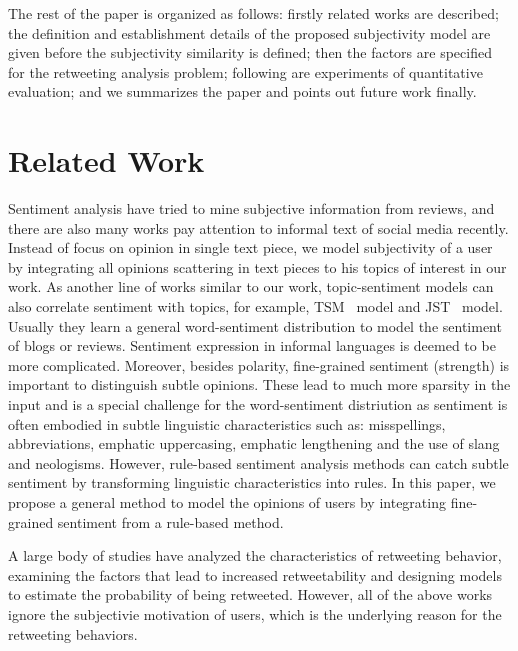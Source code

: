 \documentclass[letterpaper]{article}
\begin{document}
The rest of the paper is organized as follows: firstly related works are described; the definition and establishment details of the proposed subjectivity model are given before the subjectivity similarity is defined; then the factors are specified for the retweeting analysis problem; following are experiments of quantitative evaluation; and we summarizes the paper and points out future work finally.

\section{Related Work}
\label{relatedwork}

Sentiment analysis have tried to mine subjective information from reviews\cite{liu2012sentiment}, and there are also many works pay attention to informal text of social media recently\cite{jiang2011target,tan2011user,Guerra2014}. Instead of focus on opinion in single text piece, we model subjectivity of a user by integrating all opinions scattering in text pieces to his topics of interest in our work. As another line of works similar to our work, topic-sentiment models can also correlate sentiment with topics, for example, TSM~\cite{mei2007topic} model and JST~\cite{lin2009joint} model. Usually they learn a general word-sentiment distribution to model the sentiment of blogs or reviews. Sentiment expression in informal languages is deemed to be more complicated. Moreover, besides polarity, fine-grained sentiment (strength) is important to distinguish subtle opinions. These lead to much more sparsity in the input and is a special challenge for the word-sentiment distriution as sentiment is often embodied in subtle linguistic characteristics such as: misspellings, abbreviations, emphatic uppercasing, emphatic lengthening and the use of slang and neologisms.  However, rule-based sentiment analysis methods can catch subtle sentiment by transforming linguistic characteristics into rules\cite{thelwall2010sentiment}. In this paper, we propose a general method to model the opinions of users by integrating fine-grained sentiment from a rule-based method.
   
A large body of studies have analyzed the characteristics of retweeting behavior\cite{Bian2014,Luo:2013RMF}, examining the factors that lead to increased retweetability\cite{suh2010want,comarela2012understanding} and designing models to estimate the probability of being retweeted\cite{jenders2013analyzing,pfitzner2012emotional}. However, all of the above works ignore the subjectivie motivation of users, which is the underlying reason for the retweeting behaviors. 
\end{document}
